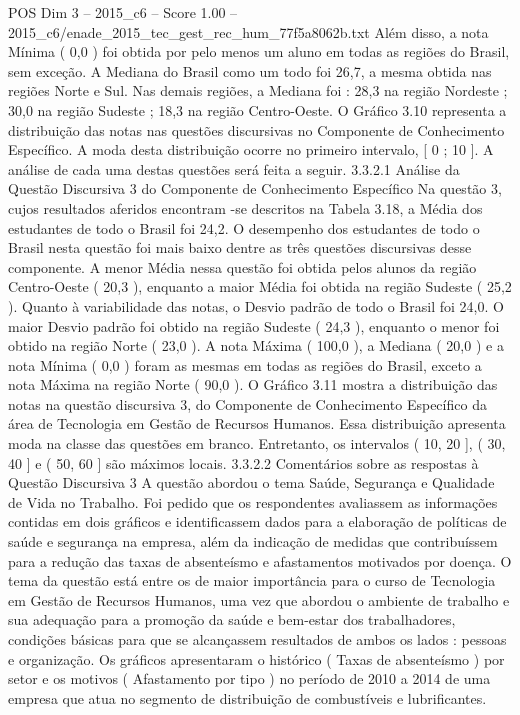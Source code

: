 \begin{textsample}{POS Dim 3 – 2015\_c6 – Score 1.00 – 2015\_c6/enade\_2015\_tec\_gest\_rec\_hum\_77f5a8062b.txt}
Além disso, a nota Mínima ( 0,0 ) foi obtida por pelo menos um aluno em todas as regiões do Brasil, sem exceção.
A Mediana do Brasil como um todo foi 26,7, a mesma obtida nas regiões Norte e Sul.
Nas demais regiões, a Mediana foi : 28,3 na região Nordeste ; 30,0 na região Sudeste ; 18,3 na região Centro-Oeste.
O Gráfico 3.10 representa a distribuição das notas nas questões discursivas no Componente de Conhecimento Específico.
A moda desta distribuição ocorre no primeiro intervalo, [ 0 ; 10 ].
A análise de cada uma destas questões será feita a seguir. 3.3.2.1 Análise da Questão Discursiva 3 do Componente de Conhecimento Específico Na questão 3, cujos resultados aferidos encontram -se descritos na Tabela 3.18, a Média dos estudantes de todo o Brasil foi 24,2.
O desempenho dos estudantes de todo o Brasil nesta questão foi mais baixo dentre as três questões discursivas desse componente.
A menor Média nessa questão foi obtida pelos alunos da região Centro-Oeste ( 20,3 ), enquanto a maior Média foi obtida na região Sudeste ( 25,2 ).
Quanto à variabilidade das notas, o Desvio padrão de todo o Brasil foi 24,0.
O maior Desvio padrão foi obtido na região Sudeste ( 24,3 ), enquanto o menor foi obtido na região Norte ( 23,0 ).
A nota Máxima ( 100,0 ), a Mediana ( 20,0 ) e a nota Mínima ( 0,0 ) foram as mesmas em todas as regiões do Brasil, exceto a nota Máxima na região Norte ( 90,0 ).
O Gráfico 3.11 mostra a distribuição das notas na questão discursiva 3, do Componente de Conhecimento Específico da área de Tecnologia em Gestão de Recursos Humanos.
Essa distribuição apresenta moda na classe das questões em branco.
Entretanto, os intervalos ( 10, 20 ], ( 30, 40 ] e ( 50, 60 ] são máximos locais. 3.3.2.2 Comentários sobre as respostas à Questão Discursiva 3 A questão abordou o tema Saúde, Segurança e Qualidade de Vida no Trabalho.
Foi pedido que os respondentes avaliassem as informações contidas em dois gráficos e identificassem dados para a elaboração de políticas de saúde e segurança na empresa, além da indicação de medidas que contribuíssem para a redução das taxas de absenteísmo e afastamentos motivados por doença.
O tema da questão está entre os de maior importância para o curso de Tecnologia em Gestão de Recursos Humanos, uma vez que abordou o ambiente de trabalho e sua adequação para a promoção da saúde e bem-estar dos trabalhadores, condições básicas para que se alcançassem resultados de ambos os lados : pessoas e organização.
Os gráficos apresentaram o histórico ( Taxas de absenteísmo ) por setor e os motivos ( Afastamento por tipo ) no período de 2010 a 2014 de uma empresa que atua no segmento de distribuição de combustíveis e lubrificantes.

\end{textsample}
